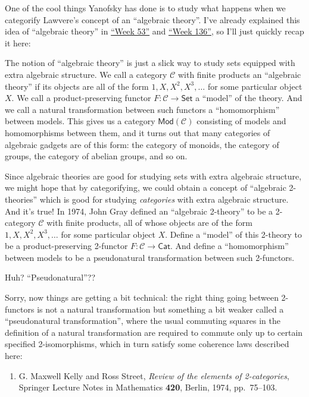 \documentclass{article}
\def\tightlist{}
\begin{document}
One of the cool things Yanofsky has done is to study what happens when
we categorify Lawvere's concept of an ``algebraic theory''. I've already
explained this idea of ``algebraic theory'' in
\protect\hyperlink{week53}{``Week 53''} and
\protect\hyperlink{week136}{``Week 136''}, so I'll just quickly recap it
here:

The notion of ``algebraic theory'' is just a slick way to study sets
equipped with extra algebraic structure. We call a category
\(\mathcal{C}\) with finite products an ``algebraic theory'' if its
objects are all of the form \(1, X, X^2, X^3, \ldots\) for some
particular object \(X\). We call a product-preserving functor
\(F\colon\mathcal{C}\to\mathsf{Set}\) a ``model'' of the theory. And we
call a natural transformation between such functors a ``homomorphism''
between models. This gives us a category \(\mathsf{Mod}(\mathcal{C})\)
consisting of models and homomorphisms between them, and it turns out
that many categories of algebraic gadgets are of this form: the category
of monoids, the category of groups, the category of abelian groups, and
so on.

Since algebraic theories are good for studying sets with extra algebraic
structure, we might hope that by categorifying, we could obtain a
concept of ``algebraic 2-theories'' which is good for studying
\emph{categories} with extra algebraic structure. And it's true! In
1974, John Gray defined an ``algebraic 2-theory'' to be a 2-category
\(\mathcal{C}\) with finite products, all of whose objects are of the
form \(1, X, X^2, X^3,\ldots\) for some particular object \(X\). Define
a ``model'' of this 2-theory to be a product-preserving 2-functor
\(F\colon\mathcal{C}\to\mathsf{Cat}\). And define a ``homomorphism''
between models to be a pseudonatural transformation between such
2-functors.

Huh? ``Pseudonatural''??

Sorry, now things are getting a bit technical: the right thing going
between 2-functors is not a natural transformation but something a bit
weaker called a ``pseudonatural transformation'', where the usual
commuting squares in the definition of a natural transformation are
required to commute only up to certain specified 2-isomorphisms, which
in turn satisfy some coherence laws described here:

\begin{enumerate}
\def\labelenumi{\arabic{enumi})}
\setcounter{enumi}{5}
\tightlist
\item
  G. Maxwell Kelly and Ross Street, \emph{Review of the elements of
  2-categories}, Springer Lecture Notes in Mathematics \textbf{420},
  Berlin, 1974, pp.~75--103.
\end{enumerate}
\end{document}
